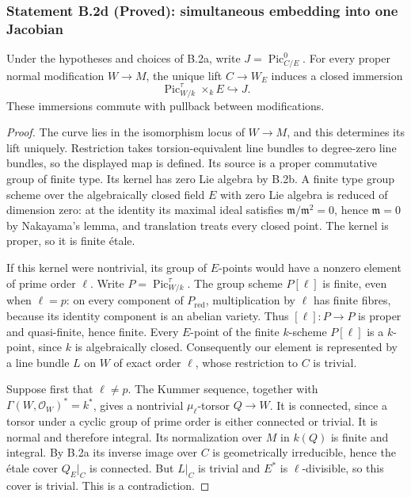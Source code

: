 \subsubsection*{Statement B.2d (Proved): simultaneous embedding into one Jacobian}
Under the hypotheses and choices of B.2a, write $J=\operatorname{Pic}^0_{C/E}$.
For every proper normal modification $W\to M$, the unique lift
$C\to W_E$ induces a closed immersion
\[
 \operatorname{Pic}^{\tau}_{W/k}\times_kE\hookrightarrow J.
 \tag{B.2.J}
\]
These immersions commute with pullback between modifications.
\begin{proof}
The curve lies in the isomorphism locus of $W\to M$, and this determines
its lift uniquely.  Restriction takes torsion-equivalent line bundles to
degree-zero line bundles, so the displayed map is defined.  Its source
is a proper commutative group of finite type.  Its kernel has zero Lie
algebra by B.2b.  A finite type group scheme over the algebraically closed
field $E$ with zero Lie algebra is reduced of dimension zero: at the
identity its maximal ideal satisfies $\mathfrak m/\mathfrak m^2=0$,
hence $\mathfrak m=0$ by Nakayama's lemma, and translation treats every
closed point.  The kernel is proper, so it is finite \'etale.

If this kernel were nontrivial, its group of $E$-points would have a
nonzero element of prime order $\ell$.  Write
$P=\operatorname{Pic}^{\tau}_{W/k}$.  The group scheme $P[\ell]$ is
finite, even when $\ell=p$: on every component of $P_{\mathrm{red}}$,
multiplication by $\ell$ has finite fibres, because its identity component
is an abelian variety.  Thus $[\ell]:P\to P$ is proper and quasi-finite,
hence finite.  Every $E$-point of the finite $k$-scheme $P[\ell]$ is a
$k$-point, since $k$ is algebraically closed.  Consequently our element
is represented by a line bundle $L$ on $W$ of exact order $\ell$, whose
restriction to $C$ is trivial.

Suppose first that $\ell\ne p$.  The Kummer sequence, together with
$\Gamma(W,\mathcal O_W)^*=k^*$, gives a nontrivial
$\mu_\ell$-torsor $Q\to W$.  It is connected, since a torsor under
a cyclic group of prime order is either connected or trivial.  It is
normal and therefore integral.  Its normalization over $M$ in $k(Q)$
is finite and integral.  By B.2a its inverse image over $C$ is
geometrically irreducible, hence the \'etale cover $Q_E|_C$ is connected.
But $L|_C$ is trivial and $E^*$ is $\ell$-divisible, so this cover is
trivial.  This is a contradiction.


\end{proof}
